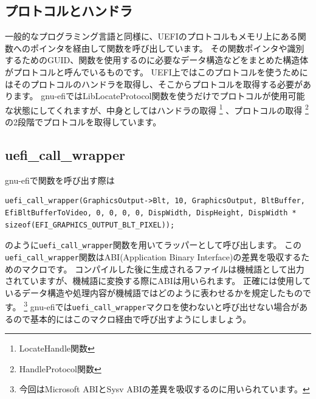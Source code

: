 \documentclass[10pt, b5paper, openany]{ltjsbook}
\begin{document}
\subsection{プロトコルとハンドラ}
一般的なプログラミング言語と同様に、UEFIのプロトコルもメモリ上にある関数へのポインタを経由して関数を呼び出しています。
その関数ポインタや識別するためのGUID、関数を使用するのに必要なデータ構造などをまとめた構造体がプロトコルと呼んでいるものです。
UEFI上ではこのプロトコルを使うためにはそのプロトコルのハンドラを取得し、そこからプロトコルを取得する必要があります。
gnu-efiではLibLocateProtocol関数を使うだけでプロトコルが使用可能な状態にしてくれますが、中身としてはハンドラの取得
\footnote{LocateHandle関数}
、プロトコルの取得
\footnote{HandleProtocol関数}
の2段階でプロトコルを取得しています。

\subsection{uefi\_call\_wrapper}
gnu-efiで関数を呼び出す際は
\begin{lstlisting}[caption=call function with gnu-efi,label=cfgnuefi]
uefi_call_wrapper(GraphicsOutput->Blt, 10, GraphicsOutput, BltBuffer, EfiBltBufferToVideo, 0, 0, 0, 0, DispWidth, DispHeight, DispWidth * sizeof(EFI_GRAPHICS_OUTPUT_BLT_PIXEL));
\end{lstlisting}
のように\verb+uefi_call_wrapper+関数を用いてラッパーとして呼び出します。
この\verb+uefi_call_wrapper+関数はABI(Application Binary Interface)の差異を吸収するためのマクロです。
コンパイルした後に生成されるファイルは機械語として出力されていますが、機械語に変換する際にABIは用いられます。
正確には使用しているデータ構造や処理内容が機械語ではどのように表わせるかを規定したものです。
\footnote{今回はMicrosoft ABIとSysv ABIの差異を吸収するのに用いられています。}
gnu-efiでは\verb+uefi_call_wrapper+マクロを使わないと呼び出せない場合があるので基本的にはこのマクロ経由で呼び出すようにしましょう。
\end{document}
